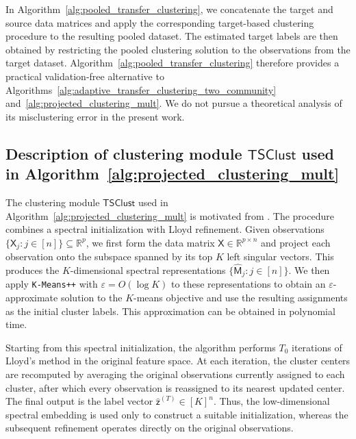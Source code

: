 \documentclass[10pt]{article}
\newcommand{\R}{\mathbb R}
\newcommand{\clustmodule}{\mathsf{TSClust}}
\begin{document}
In Algorithm~\ref{alg:pooled_transfer_clustering}, we concatenate the target and source data matrices and apply the corresponding target-based clustering procedure to the resulting pooled dataset. The estimated target labels are then obtained by restricting the pooled clustering solution to the observations from the target dataset. Algorithm~\ref{alg:pooled_transfer_clustering}
therefore provides a practical validation-free alternative to
Algorithms~\ref{alg:adaptive_transfer_clustering_two_community}
and~\ref{alg:projected_clustering_mult}. We do not pursue a theoretical
analysis of its misclustering error in the present work.

\subsection{Description of clustering module $\clustmodule{}$ used in Algorithm~\ref{alg:projected_clustering_mult}}
\label{sec:ts_clust_intro}
The clustering module $\clustmodule{}$ used in Algorithm~\ref{alg:projected_clustering_mult} is motivated from \cite{gao2022iterative}. The procedure combines a spectral initialization with Lloyd refinement. Given observations $\{\mathsf X_j:j\in[n]\}\subseteq\R^p$, we first form the data matrix $\mathsf X\in\R^{p\times n}$ and project each observation onto the subspace spanned by its top $K$ left singular vectors. This produces the $K$-dimensional spectral representations $\{\widehat{\mathsf M}_j:j\in[n]\}$. We then apply \texttt{K-Means++} \citep{arthur2007k} with $\varepsilon=O(\log K)$ to these representations to obtain an $\varepsilon$-approximate solution to the $K$-means objective and use the resulting assignments as the initial cluster labels. This approximation can be obtained in polynomial time.

Starting from this spectral initialization, the algorithm performs $T_0$ iterations of Lloyd's method in the original feature space. At each iteration, the cluster centers are recomputed by averaging the original observations currently assigned to each cluster, after which every observation is reassigned to its nearest updated center. The final output is the label vector $\widehat{\mathsf z}^{(T)}\in[K]^n$. Thus, the low-dimensional spectral embedding is used only to construct a suitable initialization, whereas the subsequent refinement operates directly on the original observations.
\end{document}
